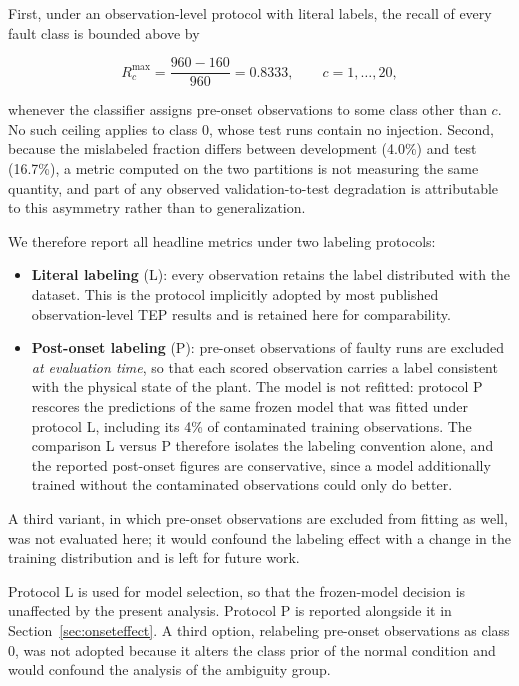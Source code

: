 \documentclass[10pt,twocolumn,a4paper]{article}
\begin{document}
First, under an observation-level protocol with literal labels, the recall of
every fault class is bounded above by

\begin{equation}
R^{\max}_c=\frac{960-160}{960}=0.8333,\qquad c=1,\dots,20,
\label{eq:ceiling}
\end{equation}

\noindent whenever the classifier assigns pre-onset observations to some class other than
$c$. No such ceiling applies to class 0, whose test runs contain no injection.
Second, because the mislabeled fraction differs between development (4.0\%) and
test (16.7\%), a metric computed on the two partitions is not measuring the
same quantity, and part of any observed validation-to-test degradation is
attributable to this asymmetry rather than to generalization.

We therefore report all headline metrics under two labeling protocols:

\begin{itemize}
  \item \textbf{Literal labeling} (L): every observation retains the label
  distributed with the dataset. This is the protocol implicitly adopted by most
  published observation-level TEP results and is retained here for
  comparability.
  \item \textbf{Post-onset labeling} (P): pre-onset observations of faulty runs
  are excluded \emph{at evaluation time}, so that each scored observation
  carries a label consistent with the physical state of the plant. The model is
  not refitted: protocol P rescores the predictions of the same frozen model
  that was fitted under protocol L, including its 4\% of contaminated training
  observations. The comparison L versus P therefore isolates the labeling
  convention alone, and the reported post-onset figures are conservative, since
  a model additionally trained without the contaminated observations could only
  do better.
\end{itemize}

A third variant, in which pre-onset observations are excluded from fitting as
well, was not evaluated here; it would confound the labeling effect with a
change in the training distribution and is left for future work.

Protocol L is used for model selection, so that the frozen-model decision is
unaffected by the present analysis. Protocol P is reported alongside it in
Section~\ref{sec:onseteffect}. A third option, relabeling pre-onset
observations as class 0, was not adopted because it alters the class prior of
the normal condition and would confound the analysis of the ambiguity group.
\end{document}

